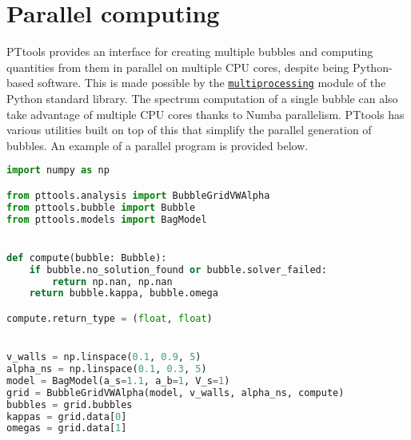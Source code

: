 \section{Parallel computing}
PTtools provides an interface for creating multiple bubbles and computing quantities from them in parallel on multiple CPU cores,
despite being Python-based software.
This is made possible by the
\href{https://docs.python.org/3/library/multiprocessing.html}{\texttt{multiprocessing}}
module of the Python standard library.
The spectrum computation of a single bubble can also take advantage of multiple CPU cores thanks to Numba parallelism.
PTtools has various utilities built on top of this that simplify the parallel generation of bubbles.
An example of a parallel program is provided below.

\begin{lstlisting}[language=Python]
import numpy as np

from pttools.analysis import BubbleGridVWAlpha
from pttools.bubble import Bubble
from pttools.models import BagModel


def compute(bubble: Bubble):
	if bubble.no_solution_found or bubble.solver_failed:
		return np.nan, np.nan
	return bubble.kappa, bubble.omega

compute.return_type = (float, float)


v_walls = np.linspace(0.1, 0.9, 5)
alpha_ns = np.linspace(0.1, 0.3, 5)
model = BagModel(a_s=1.1, a_b=1, V_s=1)
grid = BubbleGridVWAlpha(model, v_walls, alpha_ns, compute)
bubbles = grid.bubbles
kappas = grid.data[0]
omegas = grid.data[1]
\end{lstlisting}

